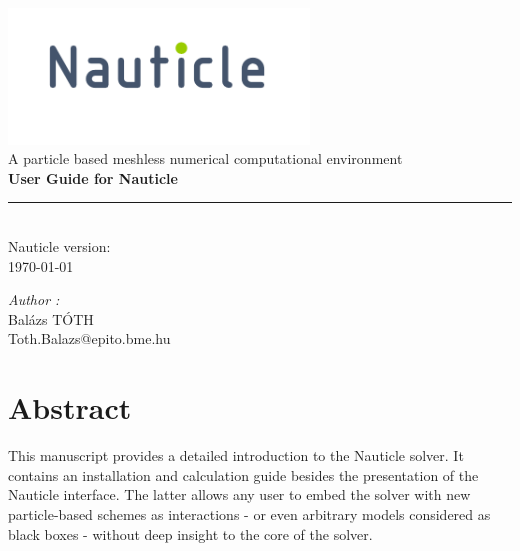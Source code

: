 \documentclass[a4paper,12pt,openany]{book}
\theoremstyle{break}
\begin{document}
\frontmatter
\begin{titlepage}
\begin{center}
\vspace{5cm}
\includegraphics[width=0.6\textwidth]{nauticle_logo.pdf}\\[0.5cm]
{\large A particle based meshless numerical computational environment}\\ [5cm]
{ \huge \bfseries User Guide for Nauticle \\[0.2cm] }
\color{nauticlegreen}
\rule{\linewidth}{1.5mm} \\[0.5cm]
\color{black}
{\large Nauticle version: \nauticleversion{} \\ \today}
\vfill
\noindent
\begin{minipage}{1\textwidth}
  \begin{flushright} \large
    \emph{Author :}\\
    Balázs TÓTH \\
    Toth.Balazs@epito.bme.hu
  \end{flushright}
\end{minipage}
\end{center}
\end{titlepage}
\clearpage\mbox{}\clearpage
\chapter{Abstract}
This manuscript provides a detailed introduction to the Nauticle solver. It contains an installation and calculation guide besides the presentation of the Nauticle interface. The latter allows any user to embed the solver with new particle-based schemes as interactions - or even arbitrary models considered as black boxes - without deep insight to the core of the solver.

\tableofcontents
\newpage
\mainmatter

\raggedbottom
\end{document}
